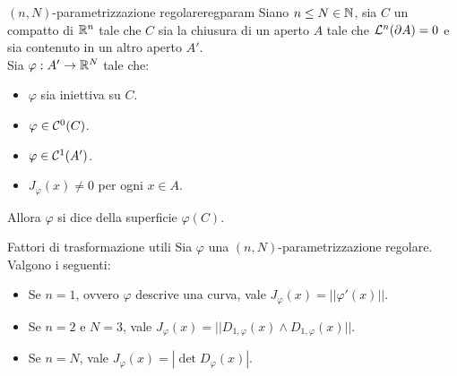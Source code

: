 \documentclass{article}
\begin{document}
\begin{definition}{$(n,N)$-parametrizzazione regolare}{regparam}
    Siano $n\le N \in \mathbb{N}$, sia $C$ un compatto di $\mathbb{R}^n$ tale che $C$ sia la chiusura di un aperto $A$ tale che $\mathcal{L}^n(\partial A) = 0$ e sia contenuto in un altro aperto $A'$.\\
    Sia $\varphi : A' \to \mathbb{R}^N$ tale che:\begin{itemize}
        \item $\varphi$ sia iniettiva su $C$.
        \item $\varphi \in \mathcal{C}^0(C)$.
        \item $\varphi \in \mathcal{C}^1(A')$.
        \item $J_\varphi(x) \neq 0$ per ogni $x \in A$.
    \end{itemize}
    Allora $\varphi$ si dice  della superficie $\varphi(C)$.
\end{definition}

\begin{remark}{Fattori di trasformazione utili}{}
    Sia $\varphi$ una $(n,N)$-parametrizzazione regolare. Valgono i seguenti:\begin{itemize}
        \item Se $n = 1$, ovvero $\varphi$ descrive una curva, vale $J_\varphi(x) = ||\varphi'(x)||$.
        \item Se $n = 2$ e $N = 3$, vale $J_\varphi(x) = ||D_{1,\varphi}(x) \wedge D_{1,\varphi}(x)||$.
        \item Se $n = N$, vale $J_\varphi(x) = |\det{D_\varphi (x)}|$.
    \end{itemize}
\end{remark}
\end{document}
